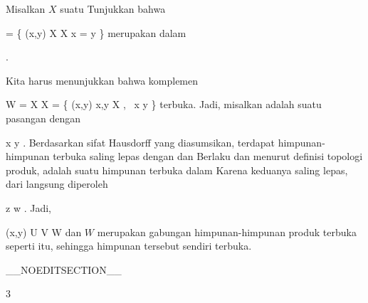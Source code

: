 {

Misalkan $X$ suatu
Tunjukkan bahwa

\mavergleichskettedisp
{\vergleichskette
{ \triangle
}
{ =} { \left\{ (x,y) \in X \times X  \mid   x = y        \right\}
}
{ } {
}
{ } {
}
{ } {
}
}
{}{}{}
merupakan
dalam

.

}
{

Kita harus menunjukkan bahwa komplemen

\mavergleichskettedisp
{\vergleichskette
{W
}
{ =} { X \times X \setminus \triangle
}
{ =} { \left\{  (x,y)   \mid   x,y \in X , \,  x \neq y       \right\}
}
{ } {
}
{ } {
}
}
{}{}{}
terbuka. Jadi, misalkan
 adalah suatu pasangan dengan

\mavergleichskette
{\vergleichskette
{ x
}
{ \neq }{ y
}
{  }{
}
{    }{
}
{   }{
}
}
{}{}{.}
Berdasarkan sifat Hausdorff yang diasumsikan, terdapat himpunan-himpunan terbuka saling lepas
 dengan
 dan
 Berlaku
 dan menurut definisi topologi produk,
 adalah suatu himpunan terbuka dalam
 Karena keduanya saling lepas, dari
 langsung diperoleh

\mavergleichskette
{\vergleichskette
{z
}
{ \neq }{w
}
{  }{
}
{    }{
}
{   }{
}
}
{}{}{.}
Jadi,

\mavergleichskettedisp
{\vergleichskette
{(x,y)
}
{ \in} { U \times V
}
{ \subseteq} {  W
}
{ } {
}
{ } {
}
}
{}{}{}
dan $W$ merupakan gabungan himpunan-himpunan produk terbuka seperti itu, sehingga himpunan tersebut sendiri terbuka.

 }

__NOEDITSECTION__

{3}

